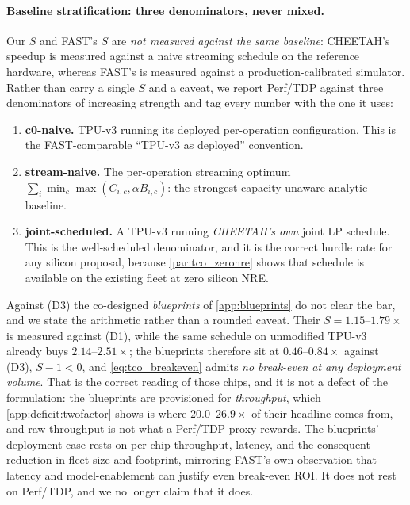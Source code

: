 \paragraph{Baseline stratification: three denominators, never mixed.}
\label{par:tco_nonparity}
Our $S$ and FAST's $S$ are \emph{not measured against the same baseline}:
CHEETAH's speedup is measured against a naive streaming schedule on the
reference hardware, whereas FAST's is measured against a production-calibrated
simulator. Rather than carry a single $S$ and a caveat, we report Perf/TDP
against three denominators of increasing strength and tag every number with the
one it uses:
%
\begin{enumerate}[label=(D\arabic*),leftmargin=*]
\item \textbf{c0-naive.} TPU-v3 running its deployed per-operation
configuration. This is the FAST-comparable ``TPU-v3 as deployed'' convention.
\item \textbf{stream-naive.} The per-operation streaming optimum
$\sum_i \min_c \max(C_{i,c}, \alpha B_{i,c})$: the strongest capacity-unaware
analytic baseline.
\item \textbf{joint-scheduled.} A TPU-v3 running \emph{CHEETAH's own} joint LP
schedule. This is the well-scheduled denominator, and it is the correct hurdle
rate for any silicon proposal, because \cref{par:tco_zeronre} shows that
schedule is available on the existing fleet at zero silicon NRE.
\end{enumerate}
%
Against (D3) the co-designed \emph{blueprints} of \cref{app:blueprints} do not
clear the bar, and we state the arithmetic rather than a rounded caveat. Their
$S=1.15\text{--}1.79\times$ is measured against (D1), while the same schedule on
unmodified TPU-v3 already buys $2.14\text{--}2.51\times$; the blueprints
therefore sit at $0.46\text{--}0.84\times$ against (D3), $S-1<0$, and
\cref{eq:tco_breakeven} admits \emph{no break-even at any deployment volume}.
That is the correct reading of those chips, and it is not a defect of the
formulation: the blueprints are provisioned for \emph{throughput}, which
\cref{app:deficit:twofactor} shows is where $20.0\text{--}26.9\times$ of their
headline comes from, and raw throughput is not what a Perf/TDP proxy rewards.
The blueprints' deployment case rests on per-chip throughput, latency, and the
consequent reduction in fleet size and footprint, mirroring FAST's own
observation that latency and model-enablement can justify even break-even ROI.
It does not rest on Perf/TDP, and we no longer claim that it does.

